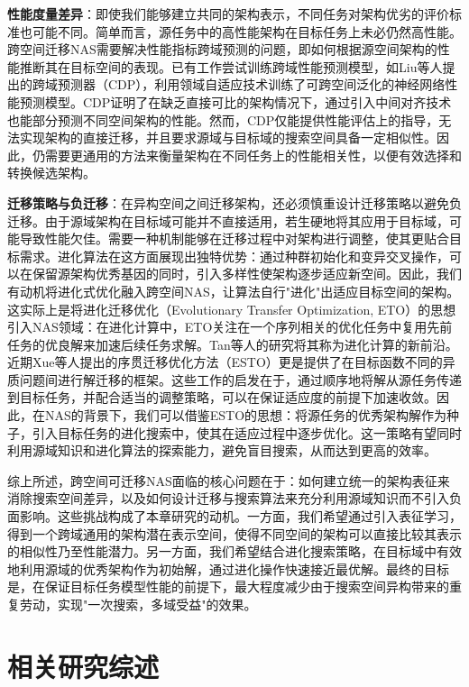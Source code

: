 \documentclass[../main.tex]{subfiles}
\begin{document}
\textbf{性能度量差异}：即使我们能够建立共同的架构表示，不同任务对架构优劣的评价标准也可能不同。简单而言，源任务中的高性能架构在目标任务上未必仍然高性能。跨空间迁移NAS需要解决性能指标跨域预测的问题，即如何根据源空间架构的性能推断其在目标空间的表现。已有工作尝试训练跨域性能预测模型，如Liu等人提出的跨域预测器（CDP），利用领域自适应技术训练了可跨空间泛化的神经网络性能预测模型。CDP证明了在缺乏直接可比的架构情况下，通过引入中间对齐技术也能部分预测不同空间架构的性能。然而，CDP仅能提供性能评估上的指导，无法实现架构的直接迁移，并且要求源域与目标域的搜索空间具备一定相似性。因此，仍需要更通用的方法来衡量架构在不同任务上的性能相关性，以便有效选择和转换候选架构。

\textbf{迁移策略与负迁移}：在异构空间之间迁移架构，还必须慎重设计迁移策略以避免负迁移。由于源域架构在目标域可能并不直接适用，若生硬地将其应用于目标域，可能导致性能欠佳。需要一种机制能够在迁移过程中对架构进行调整，使其更贴合目标需求。进化算法在这方面展现出独特优势：通过种群初始化和变异交叉操作，可以在保留源架构优秀基因的同时，引入多样性使架构逐步适应新空间。因此，我们有动机将进化式优化融入跨空间NAS，让算法自行"进化"出适应目标空间的架构。这实际上是将进化迁移优化（Evolutionary Transfer Optimization, ETO）的思想引入NAS领域：在进化计算中，ETO关注在一个序列相关的优化任务中复用先前任务的优良解来加速后续任务求解。Tan等人的研究将其称为进化计算的新前沿。近期Xue等人提出的序贯迁移优化方法（ESTO）更是提供了在目标函数不同的异质问题间进行解迁移的框架。这些工作的启发在于，通过顺序地将解从源任务传递到目标任务，并配合适当的调整策略，可以在保证适应度的前提下加速收敛。因此，在NAS的背景下，我们可以借鉴ESTO的思想：将源任务的优秀架构解作为种子，引入目标任务的进化搜索中，使其在适应过程中逐步优化。这一策略有望同时利用源域知识和进化算法的探索能力，避免盲目搜索，从而达到更高的效率。

综上所述，跨空间可迁移NAS面临的核心问题在于：如何建立统一的架构表征来消除搜索空间差异，以及如何设计迁移与搜索算法来充分利用源域知识而不引入负面影响。这些挑战构成了本章研究的动机。一方面，我们希望通过引入表征学习，得到一个跨域通用的架构潜在表示空间，使得不同空间的架构可以直接比较其表示的相似性乃至性能潜力。另一方面，我们希望结合进化搜索策略，在目标域中有效地利用源域的优秀架构作为初始解，通过进化操作快速接近最优解。最终的目标是，在保证目标任务模型性能的前提下，最大程度减少由于搜索空间异构带来的重复劳动，实现"一次搜索，多域受益"的效果。

\section[\hspace{-2pt}相关研究综述]{\heiti{}\hspace{-8pt}相关研究综述}
\label{sec:chapter4_related_work}
\end{document}
